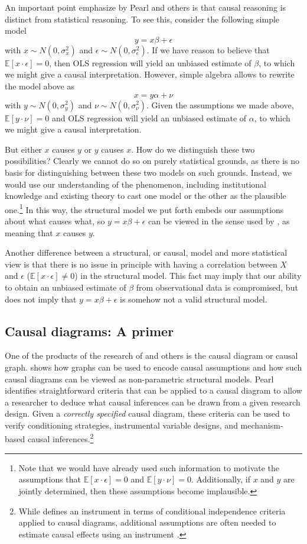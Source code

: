 \documentclass[11pt,reqno]{amsart}
\begin{document}
An important point emphasize by Pearl and others is that causal reasoning is distinct from statistical reasoning.
To see this, consider the following simple model
\[ y = x \beta + \epsilon \]
with $x \sim N(0, \sigma_x^2)$ and $\epsilon  \sim N(0, \sigma_{\epsilon}^2)$.
If we have reason to believe that $\mathbb{E}[x \cdot \epsilon] = 0$, then OLS regression will yield an unbiased estimate of $\beta$, to which we might give a causal interpretation.
However, simple algebra allows to rewrite the model above as 
\[ x = y \alpha + \nu \]
with $y \sim N(0, \sigma_y^2)$ and $\nu  \sim N(0, \sigma_{\nu}^2)$.
Given the assumptions we made above, $\mathbb{E}[y \cdot \nu] = 0$ and OLS regression will yield an unbiased estimate of $\alpha$, to which we might give a causal interpretation.

But either $x$ causes $y$ or $y$ causes $x$. 
How do we distinguish these two possibilities?
Clearly we cannot do so on purely statistical grounds, as there is no basis for distinguishing between these two models on such grounds.
Instead, we would use our understanding of the phenomenon, including institutional knowledge and existing theory to cast one model or the other as the plausible one.\footnote{
Note that we would have already used such information to motivate the assumptions that $\mathbb{E}[x \cdot \epsilon] = 0$ and $\mathbb{E}[y \cdot \nu] = 0$.
Additionally, if $x$ and $y$ are jointly determined, then these assumptions become implausible.}
In this way, the structural model we put forth embeds our assumptions about what causes what, so $y = x \beta + \epsilon$ can be viewed in the sense used by \citet[p.979]{Goldberger:1972cq}, as meaning that $x$ causes $y$.

Another difference between a structural, or causal, model and more statistical view is that there is no issue in principle with having a correlation between $X$ and $\epsilon$ ($\mathbb{E} [x \cdot \epsilon] \neq 0$) in the structural model.
This fact may imply that our ability to obtain an unbiased estimate of $\beta$ from observational data is compromised, but does not imply that $y = x \beta + \epsilon$ is somehow not a valid structural model.

\subsection{Causal diagrams: A primer}
One of the products of the research of \citet{Pearl:2009kh} and others is the causal diagram or causal graph.
\citet{Pearl:2009kh} shows how graphs can be used to encode causal assumptions and how such causal diagrams can be viewed as non-parametric structural models.
Pearl identifies straightforward criteria that can be applied to a causal diagram to allow a researcher to deduce what causal inferences can be drawn from a given research design.
Given a \emph{correctly specified} causal diagram, these criteria can be used to verify conditioning strategies, instrumental variable designs, and mechanism-based causal inferences.\footnote{While \citet[p.248]{Pearl:2009kh} defines an instrument in terms of conditional independence criteria applied to causal diagrams, additional assumptions are often needed to estimate causal effects using an instrument \citep{Angrist:1996p7456}.}
\end{document}
